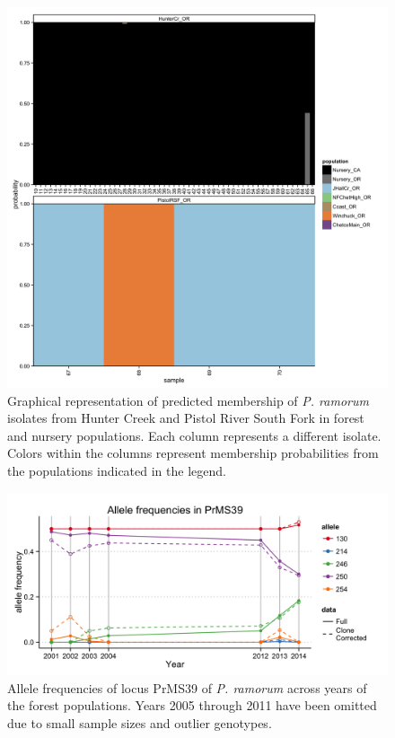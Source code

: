 \documentclass[double,12pt]{beavtex}
\begin{document}
  \begin{figure}
  
  {\centering \includegraphics[width=0.8\linewidth]{figure/phytopathology/figureS8} 
  
  }
  
  \caption[Graphical representation of predicted membership of \emph{P. ramorum}
  isolates from Hunter Creek and Pistol River South Fork in forest and
  nursery populations.]{Graphical representation of predicted membership of \emph{P. ramorum}
  isolates from Hunter Creek and Pistol River South Fork in forest and
  nursery populations. Each column represents a different isolate. Colors
  within the columns represent membership probabilities from the
  populations indicated in the legend.}\label{fig:ramS8}
  \end{figure}
  
  \begin{figure}
  
  {\centering \includegraphics[width=0.8\linewidth]{figure/phytopathology/figureS9} 
  
  }
  
  \caption[Allele frequencies of locus PrMS39 of \emph{P. ramorum} across years of
  the forest populations.]{Allele frequencies of locus PrMS39 of \emph{P. ramorum} across years of
  the forest populations. Years 2005 through 2011 have been omitted due to
  small sample sizes and outlier genotypes.}\label{fig:ramS9}
  \end{figure}
  
\end{document}
